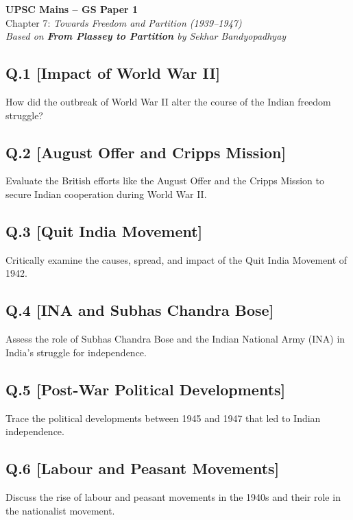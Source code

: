 \begin{center}
    \Large\textbf{UPSC Mains – GS Paper 1}\\
    \normalsize Chapter 7: \textit{Towards Freedom and Partition (1939–1947)}\\
    \vspace{0.5em}
    \textit{Based on \textbf{From Plassey to Partition} by Sekhar Bandyopadhyay}
\end{center}

\vspace{1em}

\subsection*{Q.1 [Impact of World War II]}
How did the outbreak of World War II alter the course of the Indian freedom struggle?

\subsection*{Q.2 [August Offer and Cripps Mission]}
Evaluate the British efforts like the August Offer and the Cripps Mission to secure Indian cooperation during World War II.

\subsection*{Q.3 [Quit India Movement]}
Critically examine the causes, spread, and impact of the Quit India Movement of 1942.

\subsection*{Q.4 [INA and Subhas Chandra Bose]}
Assess the role of Subhas Chandra Bose and the Indian National Army (INA) in India's struggle for independence.

\subsection*{Q.5 [Post-War Political Developments]}
Trace the political developments between 1945 and 1947 that led to Indian independence.

\subsection*{Q.6 [Labour and Peasant Movements]}
Discuss the rise of labour and peasant movements in the 1940s and their role in the nationalist movement.

